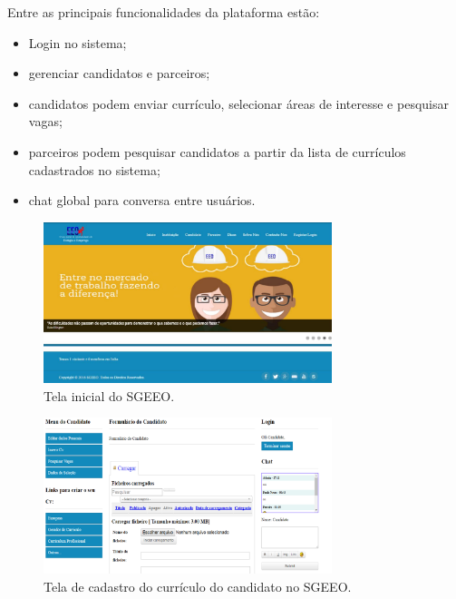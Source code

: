 Entre as principais funcionalidades da plataforma estão:

\begin{itemize}
    \item Login no sistema;
    \item gerenciar candidatos e parceiros;
    \item candidatos podem enviar currículo, selecionar áreas de interesse e pesquisar vagas;
    \item parceiros podem pesquisar candidatos a partir da lista de currículos cadastrados no sistema;
    \item chat global para conversa entre usuários.
\end{itemize}

\begin{figure}[h]
    \caption{Tela inicial do SGEEO.}
       	\begin{center}
            \includegraphics[width=0.75\textwidth]{figuras/rel01.png}
        \end{center}
    \label{telaHomeSGEEO}
\end{figure}

\begin{figure}[h]
    \caption{Tela de cadastro do currículo do candidato no SGEEO.}
       	\begin{center}
            \includegraphics[width=0.75\textwidth]{figuras/rel02.png}
        \end{center}
    \label{telaCandidatoSGEEO}
\end{figure}

